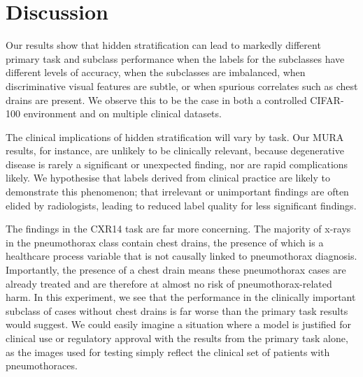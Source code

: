\documentclass{article}
\begin{document}
%

\section{Discussion}

Our results show that hidden stratification can lead to markedly different primary task and subclass performance when the labels for the subclasses have different levels of accuracy, when the subclasses are imbalanced, when discriminative visual features are subtle, or when spurious correlates such as chest drains are present.
We observe this to be the case in both a controlled CIFAR-100 environment and on multiple clinical datasets.

The clinical implications of hidden stratification will vary by task. 
Our MURA results, for instance, are unlikely to be clinically relevant, because degenerative disease is rarely a significant or unexpected finding, nor are rapid complications likely. 
We hypothesise that labels derived from clinical practice are likely to demonstrate this phenomenon; that irrelevant or unimportant findings are often elided by radiologists, leading to reduced label quality for less significant findings.

The findings in the CXR14 task are far more concerning. 
The majority of x-rays in the pneumothorax class contain chest drains, the presence of which is a healthcare process variable that is not causally linked to pneumothorax diagnosis.
 Importantly, the presence of a chest drain means these pneumothorax cases are already treated and are therefore at almost no risk of pneumothorax-related harm. 
 In this experiment, we see that the performance in the clinically important subclass of cases without chest drains is far worse than the primary task results would suggest. 
 We could easily imagine a situation where a model is justified for clinical use or regulatory approval with the results from the primary task alone, as the images used for testing simply reflect the clinical set of patients with pneumothoraces.
 
\end{document}
